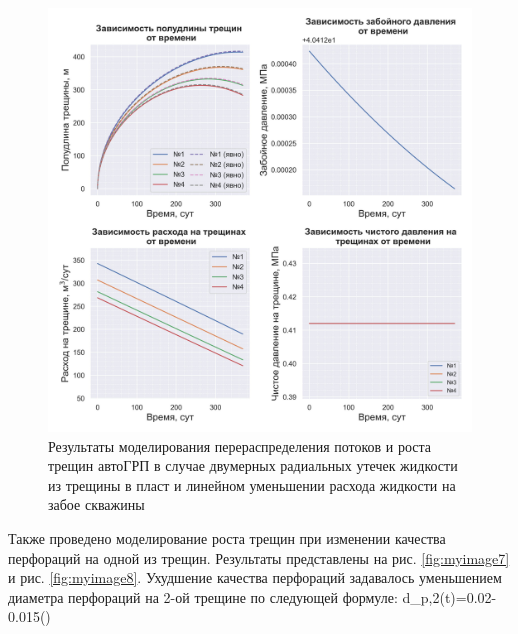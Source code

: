 \begin{figure}[H] 
\center
\includegraphics[width=\linewidth]{images/myimage6.jpg}
\caption{Результаты моделирования перераспределения потоков и роста трещин автоГРП в случае двумерных радиальных утечек жидкости из трещины в пласт и линейном уменьшении расхода жидкости на забое скважины}
\label{fig:myimage6}
\end{figure}

Также проведено моделирование роста трещин при изменении качества перфораций на одной из трещин.
Результаты представлены на рис. \ref{fig:myimage7} и рис. \ref{fig:myimage8}.
Ухудшение качества перфораций задавалось уменьшением диаметра перфораций на 2-ой трещине по следующей формуле:
\beq
d_{p,2}(t)=0.02-0.015\cdot\left(\right)
\eeq

